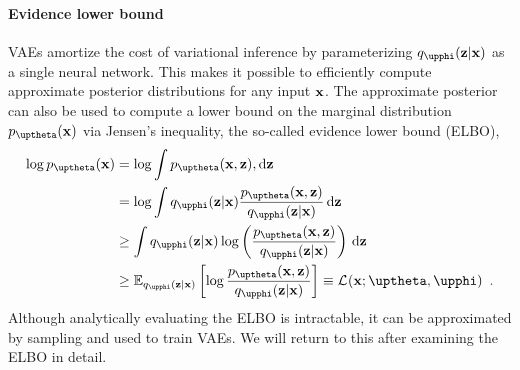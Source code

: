 \paragraph{Evidence lower bound}
VAEs amortize the cost of variational inference by parameterizing $q_\phib(\zb|\xb)$ as a single neural network. This makes it possible to efficiently compute approximate posterior distributions for any input ${\mathbf{x}}$. The approximate posterior can also be used to compute a lower bound on the marginal distribution $p_\thetab(\xb)$ via Jensen's inequality, the so-called evidence lower bound (ELBO), 
%
 \begin{align} \label{eq:variational-autoencoder-elbo}
    \log p_\thetab(\xb)
    &= \log \int p_\thetab(\xb,\zb),\textrm{d}\zb \nonumber \\
    &= \log \int q_\phib(\zb|\xb) \frac{p_\thetab(\xb,\zb)}{q_\phib(\zb|\xb)}\,\textrm{d}\zb \nonumber \\
    &\geq \int q_\phib(\zb|\xb) \log \left( \frac{p_\thetab(\xb,\zb)}{q_\phib(\zb|\xb)} \right) \,\textrm{d}\zb \nonumber \\
    &\geq \mathbb{E}_{q_\phib(\zb|\xb)} \left[ \log \frac{p_\thetab(\xb,\zb)}{q_\phib(\zb|\xb)} \right] \equiv \mathcal{L}_{}(\xb;\thetab,\phib) \enspace .
\end{align}
%
Although analytically evaluating the ELBO is intractable, it can be approximated by sampling and used to train VAEs. We will return to this after examining the ELBO in detail.


